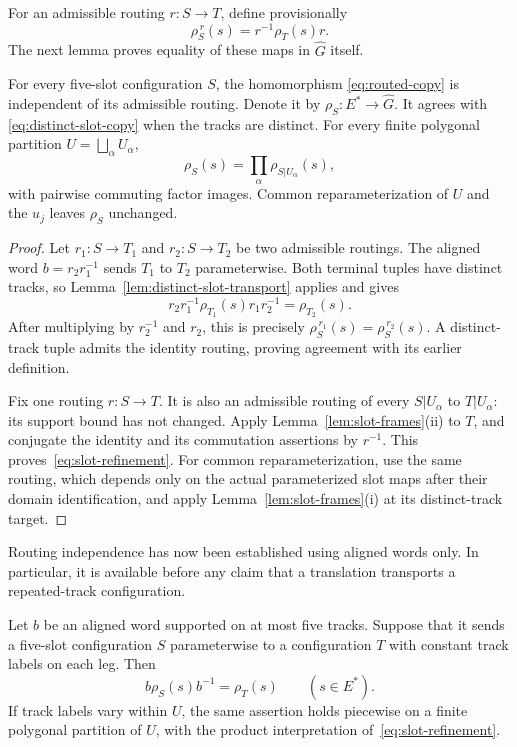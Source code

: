 For an admissible routing $r:S\to T$, define provisionally
\begin{equation}
 \rho_S^{\,r}(s)=r^{-1}\rho_T(s)r.
 \label{eq:routed-copy}
\end{equation}
The next lemma proves equality of these maps in $\widehat G$ itself.

\begin{lemma}\label{lem:routing-independence}
For every five-slot configuration $S$, the homomorphism
\eqref{eq:routed-copy} is independent of its admissible routing.  Denote
it by $\rho_S:E^\ast\to\widehat G$.  It agrees with
\eqref{eq:distinct-slot-copy} when the tracks are distinct.  For every
finite polygonal partition $U=\bigsqcup_\alpha U_\alpha$,
\begin{equation}
 \rho_S(s)=\prod_\alpha\rho_{S|U_\alpha}(s),
 \label{eq:slot-refinement}
\end{equation}
with pairwise commuting factor images.  Common reparameterization of
$U$ and the $u_j$ leaves $\rho_S$ unchanged.
\end{lemma}

\begin{proof}
Let $r_1:S\to T_1$ and $r_2:S\to T_2$ be two admissible routings.  The
aligned word $b=r_2r_1^{-1}$ sends $T_1$ to $T_2$ parameterwise.  Both
terminal tuples have distinct tracks, so Lemma~\ref{lem:distinct-slot-transport}
applies and gives
\[
 r_2r_1^{-1}\rho_{T_1}(s)r_1r_2^{-1}=\rho_{T_2}(s).
\]
After multiplying by $r_2^{-1}$ and $r_2$, this is precisely
$\rho_S^{\,r_1}(s)=\rho_S^{\,r_2}(s)$.  A distinct-track tuple admits the
identity routing, proving agreement with its earlier definition.

Fix one routing $r:S\to T$.  It is also an admissible routing of every
$S|U_\alpha$ to $T|U_\alpha$: its support bound has not changed.  Apply
Lemma~\ref{lem:slot-frames}(ii) to $T$, and conjugate the identity and its
commutation assertions by $r^{-1}$.  This proves~\eqref{eq:slot-refinement}.
For common reparameterization, use the same routing, which depends only
on the actual parameterized slot maps after their domain identification,
and apply Lemma~\ref{lem:slot-frames}(i) at its distinct-track target.
\end{proof}

Routing independence has now been established using aligned words only.
In particular, it is available before any claim that a translation
transports a repeated-track configuration.

\begin{lemma}
\label{lem:aligned-slot-transport}
Let $b$ be an aligned word supported on at most five tracks.  Suppose
that it sends a five-slot configuration $S$ parameterwise to a
configuration $T$ with constant track labels on each leg.  Then
\begin{equation}
 b\rho_S(s)b^{-1}=\rho_T(s)\qquad(s\in E^\ast).
 \label{eq:aligned-slot-transport}
\end{equation}
If track labels vary within $U$, the same assertion holds piecewise on
a finite polygonal partition of $U$, with the product interpretation
of~\eqref{eq:slot-refinement}.
\end{lemma}


